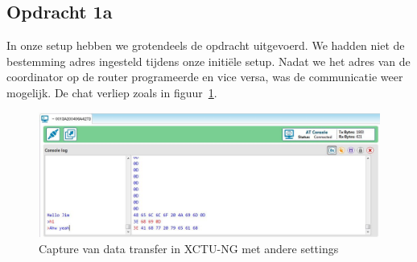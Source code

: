\documentclass[12pt]{article}
\begin{document}
\subsection*{Opdracht 1a}
In onze setup hebben we grotendeels de opdracht uitgevoerd. We hadden niet de bestemming adres ingesteld tijdens onze initi\"{e}le setup. Nadat we het adres van de coordinator op de router programeerde en vice versa, was de communicatie weer mogelijk. De chat verliep zoals in figuur~\ref{fig:output3}.\\
\begin{center}
\begin{figure}[h]
\includegraphics[scale=1]{Serial_Capture_2.JPG}
\caption{Capture van data transfer in XCTU-NG met andere settings}
\label{fig:output3}
\end{figure}
\end{center}
\clearpage
\end{document}
